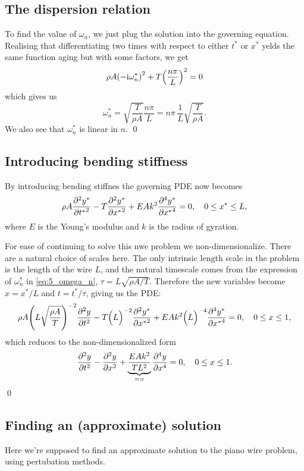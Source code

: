 \documentclass[11pt,letter, swedish, english
]{article}
\begin{document}
\subsection{The dispersion relation}
To find the value of $\omega_n$, we just plug the solution into the
governing equation. Realising that differentiating two times with
respect to either $t^*$ or $x^*$ yelds the same function aging but with
some factors, we get
\begin{equation}
\rho A \qty(-\mathrm{i}\omega_n^*)^2 + T \qty(\frac{n\pi}{L})^2=0
\end{equation}
which gives us
\begin{equation}\label{eq:5_omega_n}
\omega_n^* = \sqrt{\frac{T}{\rho A}} \frac{n\pi}{L} 
= n\pi\,\frac{1}{L}\sqrt{\frac{T}{\rho A}}.
\end{equation}
We also see that $\omega_n^*$ is linear in $n$.
\qed 

\subsection{Introducing bending stiffness}
By introducing bending stiffnes the governing PDE now becomes
\begin{equation}
\rho A \pdv[2]{y^*}{{t^*}} - T\pdv[2]{y^*}{{x^*}} +EAk^2\pdv[4]{y^*}{{x^*}}
= 0 \qcomma 0\le x^*\le L,
\end{equation}
where $E$ is the Young's modulus and $k$ is the radius of gyration. 

For ease of continuing to solve this nwe problem we
non-dimensionalize. There are a natural choice of scales here. The
only intrinsic length scale in the problem is the length of the wire
$L$, and the natural timescale comes from the expression of $\omega_n^*$
in \eqref{eq:5_omega_n}, $\tau=L\sqrt{\rho A/T}$. Therefore the new
variables become $x=x^*/L$ and $t=t^*/\tau$, giving us the PDE:
\begin{equation}
\rho A {\qty(L\sqrt{\frac{\rho A}{T}})^{-2}} \pdv[2]{y}{t} 
- T {\Big(L\Big)^{-2}} \pdv[2]{y^*}{{x^*}} 
+ EAk^2 \Big(L\Big)^{-4} \pdv[4]{y^*}{{x^*}}
= 0 \qcomma 0\le x\le1,
\end{equation}
which reduces to the non-dimensionalized form
\begin{equation}
\pdv[2]{y}{t} - \pdv[2]{y}{x} + 
\underbrace{\frac{EAk^2}{TL^2}}_{=:\epsilon}\pdv[4]{y}{x} = 0
\qcomma 0\le x\le1.
\end{equation}
\qed

\subsection{Finding an (approximate) solution}
Here we're supposed to find an approximate solution to the piano wire
problem, using pertubation methods. 
\end{document}
